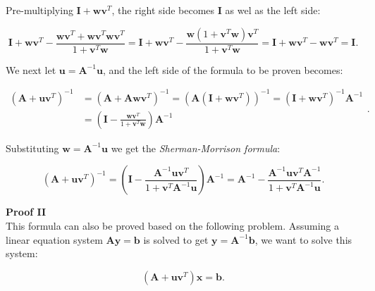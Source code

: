 \documentclass[10pt,b5paper,titlepage]{book}
\begin{document}
Pre-multiplying $\mathbf{I} + \mathbf{w}\mathbf{v}^{T}$, the right side becomes
$\mathbf{I}$ as wel as the left side:

\begin{equation}
    \mathbf{I} + \mathbf{w}\mathbf{v}^{T}
    - \frac{\mathbf{w}\mathbf{v}^{T} + \mathbf{w}\mathbf{v}^{T}\mathbf{w}\mathbf{v}^{T}}
    {1 + \mathbf{v}^{T}\mathbf{w}}
    = \mathbf{I} + \mathbf{w}\mathbf{v}^{T}
    - \frac{\mathbf{w}(1 + \mathbf{v}^{T}\mathbf{w})\mathbf{v}^{T}}
    {1 + \mathbf{v}^{T}\mathbf{w}}
    = \mathbf{I} + \mathbf{w}\mathbf{v}^{T} - \mathbf{w}\mathbf{v}^{T} = \mathbf{I}
.\end{equation}

We next let $\mathbf{u} = \mathbf{A}^{-1}\mathbf{u}$, and the left side of the
formula to be proven becomes:

\begin{equation}
    \begin{array}{ll}
        (\mathbf{A}+\mathbf{u}\mathbf{v}^{T})^{-1}
        &= (\mathbf{A} + \mathbf{A}\mathbf{w}\mathbf{v}^{T})^{-1}
        = (\mathbf{A}(\mathbf{I}+\mathbf{w}\mathbf{v}^{T}))^{-1}
        = (\mathbf{I}+\mathbf{w}\mathbf{v}^{T})^{-1}\mathbf{A}^{-1}\\
        &= \left( \mathbf{I}
        - \frac{\mathbf{w}\mathbf{v}^{T}}{1+\mathbf{v}^{T}\mathbf{w}}\right) \mathbf{A}^{-1}
    \end{array}
.\end{equation}

Substituting $\mathbf{w} = \mathbf{A}^{-1}\mathbf{u}$ we get the
\textit{Sherman-Morrison formula}:

\begin{equation}
    (\mathbf{A}+\mathbf{u}\mathbf{v}^{T})^{-1}
    = \left( \mathbf{I}
    - \frac{\mathbf{A}^{-1}\mathbf{u}\mathbf{v}^{T}}
    {1+\mathbf{v}^{T}\mathbf{A}^{-1}\mathbf{u}} \right) \mathbf{A}^{-1}
    = \mathbf{A}^{-1}
    - \frac{\mathbf{A}^{-1}\mathbf{u}\mathbf{v}^{T}\mathbf{A}^{-1}}
    {1 + \mathbf{v}^{T}\mathbf{A}^{-1}\mathbf{u}}
.\end{equation}

\textbf{Proof II}\\

This formula can also be proved based on the following problem. Assuming a linear
equation system $\mathbf{A}\mathbf{y} = \mathbf{b}$ is solved to get
$\mathbf{y} = \mathbf{A}^{-1}\mathbf{b}$, we want to solve this system:

\begin{equation}
    (\mathbf{A} + \mathbf{u}\mathbf{v}^{T})\mathbf{x} = \mathbf{b}
.\end{equation}
\end{document}
